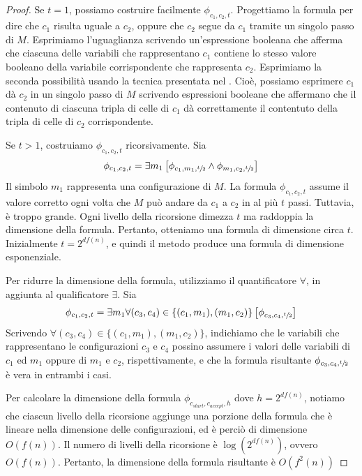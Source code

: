 \documentclass[12pt]{report}
\newcommand{\namerefl}[1]{%
	\bgroup
	\let\nmu\MakeLowercase
	\nameref{#1}\egroup}
\newcommand{\nmu}{}
\begin{document}
\begin{proof}
	Se $t = 1$, possiamo costruire facilmente $\phi_{c_1, c_2, t}$. Progettiamo la formula per dire che $c_1$ risulta uguale a $c_2$, oppure che $c_2$ segue da $c_1$ tramite un singolo passo di $M$. Esprimiamo l'uguaglianza scrivendo un'espressione booleana che afferma che ciascuna delle variabili che rappresentano $c_1$ contiene lo stesso valore booleano della variabile corrispondente che rappresenta $c_2$. Esprimiamo la seconda possibilità usando la tecnica presentata nel \namerefl{th:cool_levin}. Cioè, possiamo esprimere $c_1$ dà $c_2$ in un singolo passo di $M$ scrivendo espressioni booleane che affermano che il contenuto di ciascuna tripla di celle di $c_1$ dà correttamente il contentuto della tripla di celle di $c_2$ corrispondente.

	Se $t > 1$, costruiamo $\phi_{c_1, c_2, t}$ ricorsivamente. Sia
	\[
	\phi_{c_1, c_2, t} = \exists m_1 \left[\phi_{c_1, m_1, \sfrac{t}{2}} \wedge \phi_{m_1, c_2, \sfrac{t}{2}}\right]
	\]
	Il simbolo $m_1$ rappresenta una configurazione di $M$. La formula $\phi_{c_1, c_2, t}$ assume il valore corretto ogni volta che $M$ può andare da $c_1$ a $c_2$ in al più $t$ passi. Tuttavia, è troppo grande. Ogni livello della ricorsione dimezza $t$ ma raddoppia la dimensione della formula. Pertanto, otteniamo una formula di dimensione circa $t$. Inizialmente $t = 2^{df(n)}$, e quindi il metodo produce una formula di dimensione esponenziale.

	Per ridurre la dimensione della formula, utilizziamo il quantificatore $\forall$, in aggiunta al qualificatore $\exists$. Sia
	\[
	\phi_{c_1, c_2, t} = \exists m_1 \forall (c_3, c_4) \in \{(c_1, m_1), (m_1, c_2)\}\left[\phi_{c_3, c_4, \sfrac{t}{2}}\right]
	\]
	Scrivendo $\forall (c_3, c_4) \in \{(c_1, m_1), (m_1, c_2)\}$, indichiamo che le variabili che rappresentano le configurazioni $c_3$ e $c_4$ possino assumere i valori delle variabili di $c_1$ ed $m_1$ oppure di $m_1$ e $c_2$, rispettivamente, e che la formula risultante $\phi_{c_3, c_4, \sfrac{t}{2}}$ è vera in entrambi i casi.

	Per calcolare la dimensione della formula $\phi_{c_{start}, c_{accept}, h}$ dove $h = 2^{df(n)}$, notiamo che ciascun livello della ricorsione aggiunge una porzione della formula che è lineare nella dimensione delle configurazioni, ed è perciò di dimensione $O(f(n))$. Il numero di livelli della ricorsione è $\log\left(2^{df(n)}\right)$, ovvero $O(f(n))$. Pertanto, la dimensione della formula risultante è $O\left(f^2(n)\right)$
\end{proof}
\end{document}
